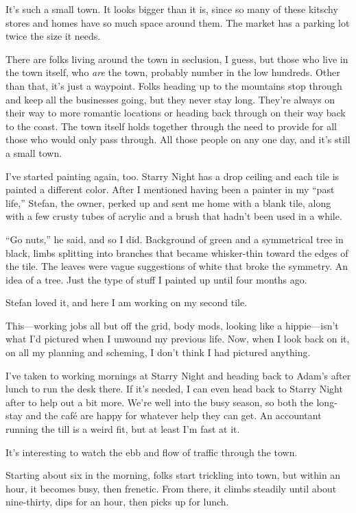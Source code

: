 It's such a small town. It looks bigger than it is, since so many of these kitschy stores and homes have so much space around them. The market has a parking lot twice the size it needs.

There are folks living around the town in seclusion, I guess, but those who live in the town itself, who \emph{are} the town, probably number in the low hundreds. Other than that, it's just a waypoint. Folks heading up to the mountains stop through and keep all the businesses going, but they never stay long. They're always on their way to more romantic locations or heading back through on their way back to the coast. The town itself holds together through the need to provide for all those who would only pass through. All those people on any one day, and it's still a small town.

I've started painting again, too. Starry Night has a drop ceiling and each tile is painted a different color. After I mentioned having been a painter in my ``past life,'' Stefan, the owner, perked up and sent me home with a blank tile, along with a few crusty tubes of acrylic and a brush that hadn't been used in a while.

``Go nuts,'' he said, and so I did. Background of green and a symmetrical tree in black, limbs splitting into branches that became whisker-thin toward the edges of the tile. The leaves were vague suggestions of white that broke the symmetry. An idea of a tree. Just the type of stuff I painted up until four months ago.

Stefan loved it, and here I am working on my second tile.

This---working jobs all but off the grid, body mods, looking like a hippie---isn't what I'd pictured when I unwound my previous life. Now, when I look back on it, on all my planning and scheming, I don't think I had pictured anything.

\secdiv{}

\noindent I've taken to working mornings at Starry Night and heading back to Adam's after lunch to run the desk there. If it's needed, I can even head back to Starry Night after to help out a bit more. We're well into the busy season, so both the long-stay and the café are happy for whatever help they can get. An accountant running the till is a weird fit, but at least I'm fast at it.

It's interesting to watch the ebb and flow of traffic through the town.

Starting about six in the morning, folks start trickling into town, but within an hour, it becomes busy, then frenetic. From there, it climbs steadily until about nine-thirty, dips for an hour, then picks up for lunch.

